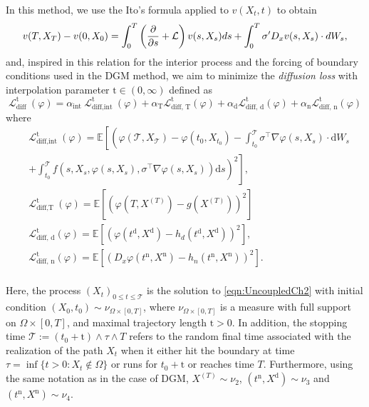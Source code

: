 In this method, we use the Ito's formula applied to $v(X_t,t)$ to obtain
\begin{equation}
	\label{eqn:itoV}
	v(T,X_T)-v(0,X_0)=\int_{0}^{T}\left(\frac{\partial }{\partial s}+\mathcal{L}\right)v(s,X_s)ds+\int_{0}^{T}\sigma'D_x v(s,X_s)\cdot dW_s,
\end{equation}
and, inspired in this relation for the interior process and the forcing of boundary conditions used in the DGM method, we aim to minimize the \textit{diffusion loss} with interpolation parameter $\mathrm{t}\in(0,\infty)$ defined as
\begin{equation}
	\mathcal{L}_{\text {diff }}^{\mathrm{t}}(\varphi)=\alpha_{\text {int }} \mathcal{L}_{\text {diff,int }}^{\mathrm{t}}(\varphi)+\alpha_{\mathrm{T}} \mathcal{L}_{\text {diff, } \mathrm{T}}^{\mathrm{t}}(\varphi)+\alpha_{\mathrm{d}} \mathcal{L}_{\text {diff, } \mathrm{d}}^{\mathrm{t}}(\varphi)+\alpha_{\mathrm{n}} \mathcal{L}_{\text {diff, } \mathrm{n}}^{\mathrm{t}}(\varphi)
\end{equation}
where
\begin{equation}
	\begin{aligned}
		& \mathcal{L}_{\text {diff,int }}^{\mathrm{t}}(\varphi)=\mathbb{E}\left[\left(\varphi\left(\mathcal{T},X_{\mathcal{T}} \right)-\varphi\left(t_0,X_{t_0}\right)-\int_{t_0}^{\mathcal{T}} \sigma^{\top} \nabla \varphi\left(s,X_s\right) \cdot \mathrm{d} W_s\right.\right. \\
		& \left.\left.+\int_{t_0}^{\mathcal{T}} f\left(s,X_s, \varphi\left(s,X_s\right), \sigma^{\top} \nabla \varphi\left(s,X_s\right)\right) \mathrm{d} s\right)^2\right] \text {, } \\
		& \mathcal{L}_{\text {diff,T }}^{\mathrm{t}}(\varphi)=\mathbb{E}\left[\left(\varphi\left(T,X^{(T)}\right)-g\left(X^{(T)}\right)\right)^2\right] \\
		& \mathcal{L}_{\text {diff, } \mathrm{d}}^{\mathrm{t}}(\varphi)=\mathbb{E}\left[\left(\varphi\left(t^{\mathrm{d}},X^{\mathrm{d}}\right)-h_d\left(t^{\mathrm{d}},X^{\mathrm{d}}\right)\right)^2\right], \\
		&
		\mathcal{L}_{\text {diff, } \mathrm{n}}^{\mathrm{t}}(\varphi)=\mathbb{E}\left[\left(D_x\varphi\left(t^{\mathrm{n}},X^{\mathrm{n}} \right)-h_n\left(t^{\mathrm{n}},X^{\mathrm{n}}\right)\right)^2\right]. \\
	\end{aligned}
\end{equation}

Here, the process $(X_t)_{0\leq t\leq \mathcal{T}}$ is the solution to \eqref{eqn:UncoupledCh2} with initial condition $(X_0,t_0)\sim \nu_{\Omega\times [0,T]}$, where $\nu_{\Omega\times [0,T]}$ is a measure with full support on $\Omega\times[0,T]$,  and maximal trajectory length $\mathrm{t}>0$. In addition, the stopping time $\mathcal{T}:=(t_0+\mathrm{t})\wedge \tau \wedge T$ refers to the random final time associated with the realization of the path $X_t$ when it either hit the boundary at time $\tau=\inf\{t>0: X_t\notin\Omega\}$ or runs for $t_0+\mathrm{t}$ or reaches time $T$. Furthermore, using the same notation as in the case of DGM, $X^{(T)} \sim \nu_{2}$, $(t^{\mathrm{n}},X^{\mathrm{d}})\sim \nu_{3}$ and $(t^\mathrm{n},X^{\mathrm{n}})\sim \nu_{4}$.

